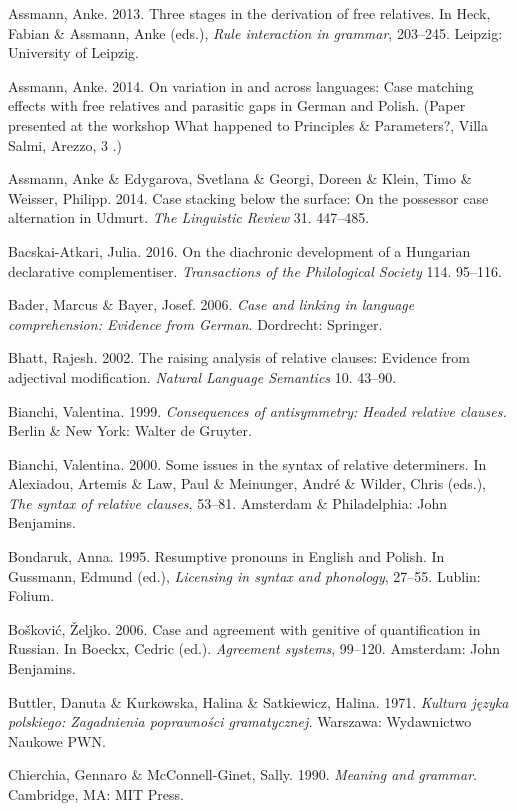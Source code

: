 \documentclass[output=paper]{langsci/langscibook}
\begin{document}
Assmann, Anke. 2013. Three stages in the derivation of free relatives. In Heck, Fabian \& Assmann, Anke (eds.), \textit{Rule interaction in grammar}, 203–245. Leipzig: University of Leipzig.

Assmann, Anke. 2014. On variation in and across languages: Case matching effects with free relatives and parasitic gaps in German and Polish. (Paper presented at the workshop What happened to Principles \& Parameters?, Villa Salmi, Arezzo, 3 \citealt{July2014}.)

Assmann, Anke \& Edygarova, Svetlana \& Georgi, Doreen \& Klein, Timo \& Weisser, Philipp. 2014. Case stacking below the surface: On the possessor case alternation in Udmurt. \textit{The Linguistic Review} 31. 447–485.

Bacskai-Atkari, Julia. 2016. On the diachronic development of a Hungarian declarative complementiser. \textit{Transactions of the Philological Society} 114. 95–116.

Bader, Marcus \& Bayer, Josef. 2006. \textit{Case and linking in language comprehension: Evidence from German}. Dordrecht: Springer. 

Bhatt, Rajesh. 2002. The raising analysis of relative clauses: Evidence from adjectival modification. \textit{Natural Language Semantics} 10. 43–90.

Bianchi, Valentina. 1999. \textit{Consequences of antisymmetry: Headed relative clauses.} Berlin \& New York: Walter de Gruyter.

Bianchi, Valentina. 2000. Some issues in the syntax of relative determiners. In Alexiadou, Artemis \& Law, Paul \& Meinunger, André \& Wilder, Chris (eds.), \textit{The syntax of relative clauses}, 53–81. Amsterdam \& Philadelphia: John Benjamins.

Bondaruk, Anna. 1995. Resumptive pronouns in English and Polish. In Gussmann, Edmund (ed.), \textit{Licensing in syntax and phonology}, 27–55. Lublin: Folium.

Bošković, Željko. 2006. Case and agreement with genitive of quantification in Russian. In Boeckx, Cedric (ed.). \textit{Agreement systems}, 99–120. Amsterdam: John Benjamins. 

Buttler, Danuta \& Kurkowska, Halina \& Satkiewicz, Halina. 1971. \textit{Kultura języka polskiego: Zagadnienia poprawności gramatycznej.} Warszawa: Wydawnictwo Naukowe PWN.

Chierchia, Gennaro \& McConnell-Ginet, Sally. 1990. \textit{Meaning and grammar}. Cambridge, MA: MIT Press.
\end{document}
